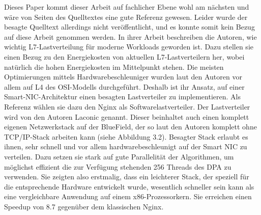Dieses Paper kommt dieser Arbeit auf fachlicher Ebene wohl am nächsten und wäre von Seiten des Quelltextes eine gute Referenz gewesen. Leider wurde der besagte Quelltext allerdings nicht veröffentlicht, und es konnte somit kein Bezug auf diese Arbeit genommen werden.
In ihrer Arbeit beschreiben die Autoren, wie wichtig L7-Lastverteilung für moderne Workloads geworden ist. Dazu stellen sie einen Bezug zu den Energiekosten von aktuellen L7-Lastverteilern her, wobei natürlich die hohen Energiekosten im Mittelpunkt stehen. Die meisten Optimierungen mittels Hardwarebeschleuniger wurden laut den Autoren vor allem auf L4 des OSI-Modells durchgeführt. Deshalb ist ihr Ansatz, auf einer Smart-NIC-Architektur einen besagten Lastverteiler zu implementieren. Als Referenz wählen sie dazu den Nginx als Softwarelastverteiler. Der Lastverteiler wird von den Autoren Laconic genannt. Dieser beinhaltet auch einen komplett eigenen Netzwerkstack auf der BlueField, der so laut den Autoren komplett ohne TCP/IP-Stack arbeiten kann (siehe Abbildung 3.2). Besagter Stack erlaubt es ihnen, sehr schnell und vor allem hardwarebeschleunigt auf der Smart NIC zu verteilen. Dazu setzen sie stark auf gute Parallelität der Algorithmen, um möglichst effizient die zur Verfügung stehenden 256 Threads des DPA zu verwenden. Sie zeigten also erstmalig, dass ein leichterer Stack, der speziell für die entsprechende Hardware entwickelt wurde, wesentlich schneller sein kann als eine vergleichbare Anwendung auf einem x86-Prozessorkern. Sie erreichen einen Speedup von 8.7 gegenüber dem klassischen Nginx.